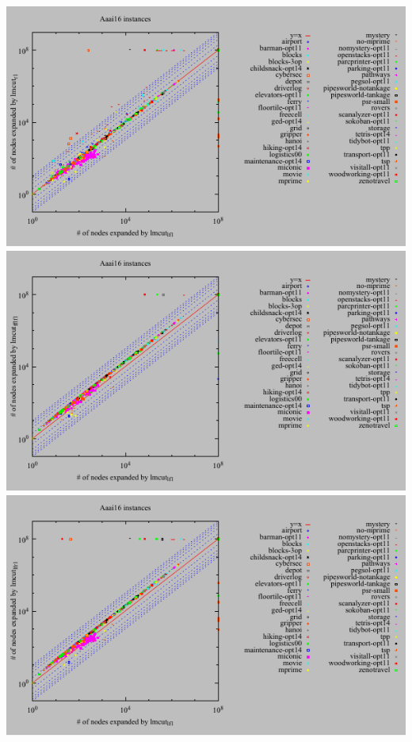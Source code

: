 \includegraphics{tables/aaai16-expanded-lmcut_lf-lmcut_r.pdf}
\linebreak
\includegraphics{tables/aaai16-expanded-lmcut_lf-lmcut_fflf.pdf}
\linebreak
\includegraphics{tables/aaai16-expanded-lmcut_lf-lmcut_lfr.pdf}
\linebreak
